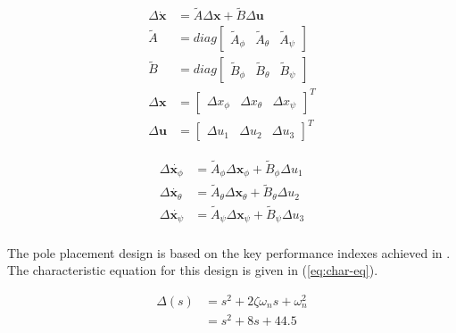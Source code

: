 \documentclass[12pt]{article}
\begin{document}
\begin{equation}
  \label{eq:MIMO}
  \begin{split}
    \Delta \dot{\mathbf{x}} &= \tilde{A} \Delta \mathbf{x} + \tilde{B} \Delta \mathbf{u} \\
    \tilde{A} &= diag\begin{bmatrix} \tilde{A}_\phi & \tilde{A}_\theta & \tilde{A}_\psi \end{bmatrix} \\
    \tilde{B} &= diag\begin{bmatrix} \tilde{B}_\phi & \tilde{B}_\theta & \tilde{B}_\psi \end{bmatrix} \\
    \Delta \mathbf{x} &= \begin{bmatrix} \Delta x_\phi & \Delta x_\theta & \Delta x_\psi \end{bmatrix}^T \\
    \Delta \mathbf{u} &= \begin{bmatrix} \Delta u_1 & \Delta u_2 & \Delta u_3 \end{bmatrix}^T
  \end{split}
\end{equation}

\begin{equation}
  \label{eq:3SISO}
  \begin{split}
    \Delta \dot{\mathbf{x}_\phi} &= \tilde{A}_\phi \Delta \mathbf{x}_\phi + \tilde{B}_\phi \Delta u_1 \\
    \Delta \dot{\mathbf{x}_\theta} &= \tilde{A}_\theta \Delta \mathbf{x}_\theta + \tilde{B}_\theta \Delta u_2 \\
    \Delta \dot{\mathbf{x}_\psi} &= \tilde{A}_\psi \Delta \mathbf{x}_\psi + \tilde{B}_\psi \Delta u_3 \\
  \end{split}
\end{equation}

The pole placement design is based on the key performance indexes achieved in \cite{Boua04}. The characteristic equation for this design is given in (\ref{eq:char-eq}).

\begin{equation}
  \label{eq:char-eq}
  \begin{split}
    \Delta (s) &= s^2 + 2 \zeta \omega_n s + \omega^2_n \\
               &= s^2 + 8 s + 44.5
  \end{split}
\end{equation}
\end{document}
